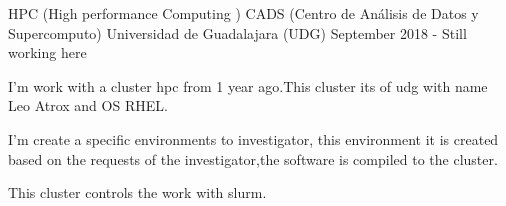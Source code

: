 \begin{cventries}
  
  \cventry
    {HPC (High performance Computing )}
    {CADS (Centro de Análisis de Datos y Supercomputo)}
    {Universidad de Guadalajara (UDG)}
    {September 2018 - Still working here}
    {
      \begin{cvitems}
        \item {I'm work with a cluster hpc from 1 year ago.This cluster its of udg with  name Leo Atrox and OS RHEL.}
        \item {I'm create a specific environments to investigator, this environment it is created based on the requests of the investigator,the software is compiled to the cluster.}
        \item {This cluster controls the work with slurm.}
      \end{cvitems}
    }


\end{cventries}
